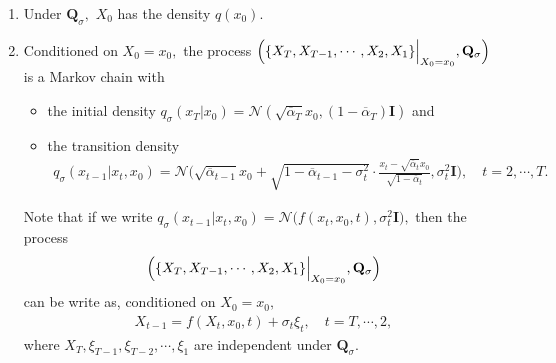 \documentclass[
]{article}
\providecommand{\tightlist}{%
  \setlength{\itemsep}{0pt}\setlength{\parskip}{0pt}}\usepackage{longtable,booktabs,array}
\theoremstyle{remark}
\begin{document}
\begin{enumerate}
\def\labelenumi{\arabic{enumi}.}
\tightlist
\item
  Under \(\mathbf{Q}_{\sigma},\) \(X_0\) has the density \(q(x_0).\)
\item
  Conditioned on \(X_0=x_0,\) the process
  \(\Bigl( \lbrace X_T,X_{T-1},\cdots, X_2,X_1\rbrace\Big\vert_{X_0=x_0}, \mathbf{Q}_{\sigma} \Bigr)\)
  is a Markov chain with

  \begin{itemize}
  \tightlist
  \item
    the initial density
    \(q_{\sigma}(x_T\vert x_0)= \mathcal{N}(\sqrt{\overline{\alpha}_T}x_0,(1-\overline{\alpha}_T)\mathbf{I})\)
    and
  \item
    the transition density \[
     \begin{aligned}
       q_{\sigma} (x_{t-1}\vert x_t,x_0) = \mathcal{N}\biggl( \sqrt{\overline{\alpha}_{t-1}}x_0 + \sqrt{1-\overline{\alpha}_{t-1} - \sigma_t^2} \cdot \frac{x_t-\sqrt{\overline{\alpha}_t}x_0}{\sqrt{1-\overline{\alpha}_t}} , \sigma_t^2 \mathbf{I} \biggr), \quad t=2,\cdots, T.
     \end{aligned}
     \]
  \end{itemize}

  Note that if we write
  \(q_{\sigma}(x_{t-1}\vert x_t,x_0)=\mathcal{N} \bigl(f(x_t,x_0,t), \sigma_t^2 \mathbf{I}\bigr),\)
  then the process \[
  \begin{aligned}
    \Bigl( \lbrace X_T,X_{T-1},\cdots, X_2,X_1\rbrace\Big\vert_{X_0=x_0}, \mathbf{Q}_{\sigma} \Bigr)
  \end{aligned}
  \] can be write as, conditioned on \(X_0=x_0,\) \[
  \begin{aligned}
    X_{t-1} = f(X_t,x_0,t) + \sigma_t \xi_t, \quad t=T,\cdots, 2,
  \end{aligned}
  \] where \(X_T,\xi_{T-1},\xi_{T-2},\cdots, \xi_{1}\) are independent
  under \(\mathbf{Q}_{\sigma}.\)
\end{enumerate}
\end{document}
